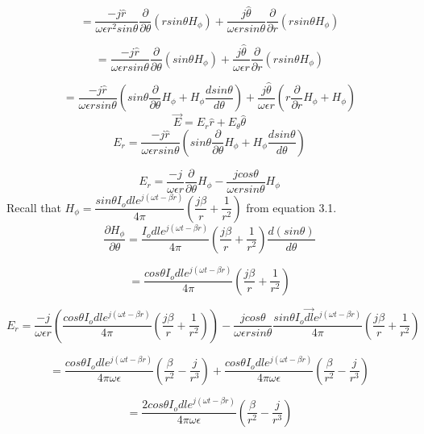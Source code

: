 $$ = \dfrac{-j \hat{r}}{\omega \epsilon r^2 sin\theta}\dfrac{\partial}{\partial \theta}(rsin\theta H_{\phi}) + \dfrac{j \hat{\theta}}{\omega  \epsilon r sin\theta}\dfrac{\partial}{\partial r}(rsin\theta H_{\phi})$$ 

$$ = \dfrac{-j \hat{r}}{\omega  \epsilon r sin\theta}\dfrac{\partial}{\partial \theta}(sin\theta H_{\phi}) + \dfrac{j \hat{\theta}}{\omega  \epsilon r}\dfrac{\partial}{\partial r}(rsin\theta H_{\phi}) $$

$$ = \dfrac{-j \hat{r}}{\omega \epsilon r sin\theta}\left(sin\theta\dfrac{\partial }{\partial \theta}H_{\phi} + H_{\phi}\dfrac{d sin\theta}{d\theta}\right) + \dfrac{j\hat{\theta}}{\omega \epsilon r}\left(r\dfrac{\partial}{\partial r}H_{\phi} + H_{\phi}\right)$$
\smallskip
$$\vec{E} = E_r\hat{r} + E_{\theta}\hat{\theta}$$
\smallskip
$$E_r = \dfrac{-j \hat{r}}{\omega \epsilon r sin\theta}\left(sin\theta\dfrac{\partial }{\partial \theta}H_{\phi} + H_{\phi}\dfrac{d sin\theta}{d\theta}\right)$$

$$E_r = \dfrac{-j}{\omega \epsilon r}\dfrac{\partial}{\partial \theta}H_{\phi} - \dfrac{j cos\theta}{\omega \epsilon rsin\theta}H_\phi$$
\smallskip
Recall that $H_{\phi} = \dfrac{sin\theta I_o dl e^{j(\omega t-\beta r)} }{4\pi} \left(\dfrac{j\beta}{r} + \dfrac{1}{r^2}\right)$ from equation 3.1.
\smallskip
$$\dfrac{\partial H_{\phi}}{\partial \theta} =  \dfrac{I_o dl e^{j(\omega t-\beta r)} }{4\pi} (\dfrac{j\beta}{r} + \dfrac{1}{r^2})\dfrac{d (sin\theta)}{d \theta}$$

$$ = \dfrac{cos \theta I_o dl e^{j(\omega t-\beta r)} }{4\pi} \left(\dfrac{j\beta}{r} + \dfrac{1}{r^2}\right)$$
 
\begin{dmath*}
	E_r =  \dfrac{-j}{\omega \epsilon r}\left(\dfrac{cos \theta I_o dl e^{j(\omega t-\beta r)} }{4\pi} \left(\dfrac{j\beta}{r} + \dfrac{1}{r^2}\right)\right) -  \dfrac{j cos\theta}{\omega \epsilon rsin\theta}\dfrac{sin\theta I_o\vec{dl} e^{j(\omega t-\beta r)} }{4\pi} \left(\dfrac{j\beta}{r} + \dfrac{1}{r^2}\right)
\end{dmath*}

$$ = \dfrac{cos \theta I_o dl e^{j(\omega t-\beta r)} }{4\pi \omega  \epsilon} \left(\dfrac{\beta}{r^2} - \dfrac{j}{r^3}\right) + \dfrac{cos \theta I_o dl e^{j(\omega t-\beta r)} }{4\pi \omega \epsilon} \left(\dfrac{\beta}{r^2} - \dfrac{j}{r^3}\right) $$

$$ = \dfrac{2 cos \theta I_o dl e^{j(\omega t-\beta r)} }{4\pi \omega\epsilon} \left(\dfrac{\beta}{r^2} - \dfrac{j}{r^3}\right) $$
 
